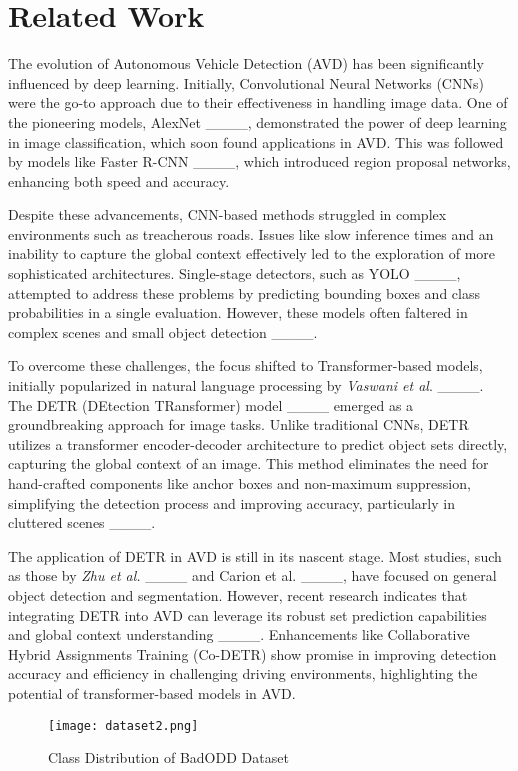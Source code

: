 \section{Related Work}
The evolution of Autonomous Vehicle Detection (AVD) has been significantly influenced by deep learning. Initially, Convolutional Neural Networks (CNNs) were the go-to approach due to their effectiveness in handling image data. One of the pioneering models, AlexNet ____, demonstrated the power of deep learning in image classification, which soon found applications in AVD. This was followed by models like Faster R-CNN ____, which introduced region proposal networks, enhancing both speed and accuracy.

Despite these advancements, CNN-based methods struggled in complex environments such as treacherous roads. Issues like slow inference times and an inability to capture the global context effectively led to the exploration of more sophisticated architectures. Single-stage detectors, such as YOLO ____, attempted to address these problems by predicting bounding boxes and class probabilities in a single evaluation. However, these models often faltered in complex scenes and small object detection ____.

To overcome these challenges, the focus shifted to Transformer-based models, initially popularized in natural language processing by \textit{Vaswani et al}. ____. The DETR (DEtection TRansformer) model ____ emerged as a groundbreaking approach for image tasks. Unlike traditional CNNs, DETR utilizes a transformer encoder-decoder architecture to predict object sets directly, capturing the global context of an image. This method eliminates the need for hand-crafted components like anchor boxes and non-maximum suppression, simplifying the detection process and improving accuracy, particularly in cluttered scenes ____.

The application of DETR in AVD is still in its nascent stage. Most studies, such as those by \textit{Zhu et al.} ____ and Carion et al. ____, have focused on general object detection and segmentation. However, recent research indicates that integrating DETR into AVD can leverage its robust set prediction capabilities and global context understanding ____. Enhancements like Collaborative Hybrid Assignments Training (Co-DETR) show promise in improving detection accuracy and efficiency in challenging driving environments, highlighting the potential of transformer-based models in AVD.

    \begin{figure}[!htb]
        \centering
        \texttt{[image: dataset2.png]}
        \caption{Class Distribution of BadODD Dataset}
        \label{fig:class-dist}
    \end{figure}
    

